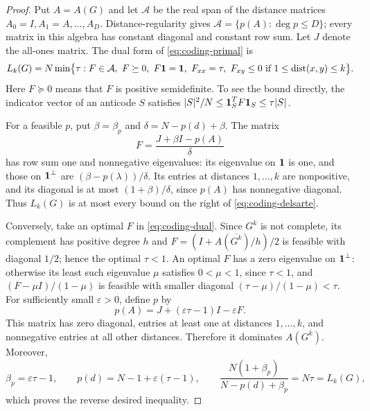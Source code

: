 \documentclass[10pt,a4paper]{article}
\theoremstyle{plain}
\numberwithin{equation}{section}
\DeclareMathOperator{\dist}{dist}
\def\1{\mbox{\boldmath $1$}}
\begin{document}
\begin{proof}
Put $A=A(G)$ and let $\mathcal A$ be the real span of the distance
matrices $A_0=I,A_1=A,\ldots,A_D$. Distance-regularity gives
$\mathcal A=\{p(A):\deg p\le D\}$; every matrix in this algebra has constant diagonal and constant row sum. Let $J$ denote the all-ones matrix. The dual form of \eqref{eq:coding-primal} is
\begin{equation}\label{eq:coding-dual}
 L_k(G)=N\min\bigl\{\tau:
 F\in\mathcal A,\ F\succeq0,\ F\1=\1,\ F_{xx}=\tau,
 \ F_{xy}\le0\ \text{if }1\le\dist(x,y)\le k\bigr\}.
\end{equation}
Here $F\succeq0$ means that $F$ is positive semidefinite. To see the
bound directly, the indicator vector of an anticode $S$ satisfies
$|S|^2/N\le\1_S^T F\1_S\le\tau|S|$.

For a feasible $p$, put $\beta=\beta_p$ and
$\delta=N-p(d)+\beta$. The matrix
\[
 F=\frac{J+\beta I-p(A)}{\delta}
\]
has row sum one and nonnegative eigenvalues: its eigenvalue on $\1$ is one, and those on $\1^\perp$ are $(\beta-p(\lambda))/\delta$. Its entries at distances $1,\ldots,k$ are nonpositive, and its diagonal is at most $(1+\beta)/\delta$, since $p(A)$ has nonnegative diagonal. Thus $L_k(G)$ is at most every bound on the right of
\eqref{eq:coding-delsarte}.

Conversely, take an optimal $F$ in \eqref{eq:coding-dual}.
Since $G^k$ is not complete, its complement has positive degree $h$ and $F=(I+A(\overline{G^k})/h)/2$ is feasible with diagonal $1/2$; hence the optimal $\tau<1$.
An optimal $F$ has a zero eigenvalue on $\1^\perp$: otherwise its least
such eigenvalue $\mu$ satisfies $0<\mu<1$, since $\tau<1$, and
$(F-\mu I)/(1-\mu)$ is feasible with smaller diagonal
$(\tau-\mu)/(1-\mu)<\tau$.
For sufficiently small $\varepsilon>0$, define $p$ by
\[
 p(A)=J+(\varepsilon\tau-1)I-\varepsilon F.
\]
This matrix has zero diagonal, entries at least one at distances
$1,\ldots,k$, and nonnegative entries at all other distances. Therefore it dominates $A(G^k)$. Moreover,
\[
 \beta_p=\varepsilon\tau-1,\qquad
 p(d)=N-1+\varepsilon(\tau-1),\qquad
 \frac{N(1+\beta_p)}{N-p(d)+\beta_p}=N\tau=L_k(G),
\]
which proves the reverse desired inequality.
\end{proof}

\end{document}
